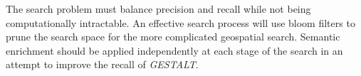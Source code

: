 The search problem must balance precision and recall while not being computationally intractable. An effective search process will use bloom filters to prune the search space for the more complicated geospatial search. Semantic enrichment should be applied independently at each stage of the search in an attempt to improve the recall of \textit{GESTALT}.